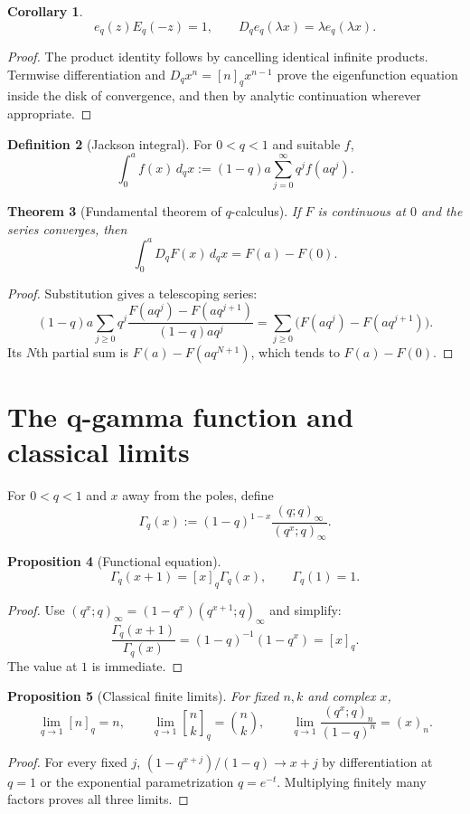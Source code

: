 \documentclass[11pt]{article}
\numberwithin{equation}{section}
\newtheorem{theorem}{Theorem}[section]
\newtheorem{proposition}[theorem]{Proposition}
\newtheorem{corollary}[theorem]{Corollary}
\theoremstyle{definition}
\newtheorem{definition}[theorem]{Definition}
\newcommand{\qbinom}[2]{\genfrac{[}{]}{0pt}{}{#1}{#2}_{q}}
\begin{document}
\begin{corollary}
\[
e_q(z)E_q(-z)=1,
\qquad D_qe_q(\lambda x)=\lambda e_q(\lambda x).
\]
\end{corollary}
\begin{proof}
The product identity follows by cancelling identical infinite products.  Termwise differentiation and $D_qx^n=[n]_qx^{n-1}$ prove the eigenfunction equation inside the disk of convergence, and then by analytic continuation wherever appropriate.
\end{proof}

\begin{definition}[Jackson integral]
For $0<q<1$ and suitable $f$,
\[
\int_0^a f(x)\,d_qx:=(1-q)a\sum_{j=0}^{\infty}q^jf(aq^j).
\]
\end{definition}

\begin{theorem}[Fundamental theorem of $q$-calculus]
If $F$ is continuous at $0$ and the series converges, then
\[
\int_0^a D_qF(x)\,d_qx=F(a)-F(0).
\]
\end{theorem}
\begin{proof}
Substitution gives a telescoping series:
\[
(1-q)a\sum_{j\ge0}q^j
\frac{F(aq^j)-F(aq^{j+1})}{(1-q)aq^j}
=\sum_{j\ge0}\bigl(F(aq^j)-F(aq^{j+1})\bigr).
\]
Its $N$th partial sum is $F(a)-F(aq^{N+1})$, which tends to $F(a)-F(0)$.
\end{proof}

\section{The q-gamma function and classical limits}
For $0<q<1$ and $x$ away from the poles, define
\[
\Gamma_q(x):=(1-q)^{1-x}\frac{(q;q)_\infty}{(q^x;q)_\infty}.
\]
\begin{proposition}[Functional equation]
\[
\Gamma_q(x+1)=[x]_q\Gamma_q(x),\qquad \Gamma_q(1)=1.
\]
\end{proposition}
\begin{proof}
Use $(q^x;q)_\infty=(1-q^x)(q^{x+1};q)_\infty$ and simplify:
\[
\frac{\Gamma_q(x+1)}{\Gamma_q(x)}
=(1-q)^{-1}(1-q^x)=[x]_q.
\]
The value at $1$ is immediate.
\end{proof}

\begin{proposition}[Classical finite limits]
For fixed $n,k$ and complex $x$,
\[
\lim_{q\to1}[n]_q=n,
\qquad
\lim_{q\to1}\qbinom nk=\binom nk,
\qquad
\lim_{q\to1}\frac{(q^x;q)_n}{(1-q)^n}=(x)_n.
\]
\end{proposition}
\begin{proof}
For every fixed $j$, $(1-q^{x+j})/(1-q)\to x+j$ by differentiation at $q=1$ or the exponential parametrization $q=e^{-t}$.  Multiplying finitely many factors proves all three limits.
\end{proof}
\end{document}
